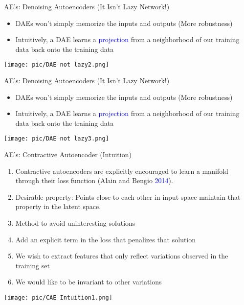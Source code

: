 \documentclass[serif, aspectratio=169]{beamer}
\begin{document}
\begin{frame}{AE’s: Denoising Autoencoders (It Isn’t Lazy Network!)}
    \begin{itemize}
        \item DAEs won’t simply memorize the inputs and outputs (More robustness)
        \item Intuitively, a DAE learns a \textcolor{blue}{projection} from a neighborhood of our training data back onto the training data 
    \end{itemize}

    \begin{center}
        \texttt{[image: pic/DAE not lazy2.png]}
    \end{center}
\end{frame}

\begin{frame}{AE’s: Denoising Autoencoders (It Isn’t Lazy Network!)}
    \begin{itemize}
        \item  DAEs won’t simply memorize the inputs and outputs (More robustness)
        \item Intuitively, a DAE learns a \textcolor{blue}{projection} from a neighborhood of our training data back onto the training data 
    \end{itemize}

    \begin{center}
        \texttt{[image: pic/DAE not lazy3.png]}
    \end{center}
\end{frame}

\begin{frame}{AE’s: Contractive Autoencoder (Intuition)}
    \small
    \begin{enumerate}
        \item Contractive autoencoders are explicitly encouraged to learn a manifold through their loss function (Alain and Bengio \textcolor{blue}{2014}).
        \item \textcolor{deepgreen}{Desirable property:} Points close to each other in input space maintain that property in the latent space.
        \item Method to avoid uninteresting solutions
        \item Add an explicit term in the loss that penalizes that solution
        \item We wish to extract features that only reflect variations observed in the training set
        \item We would like to be invariant to other variations
    \end{enumerate}
    
    
    \begin{center}
        \texttt{[image: pic/CAE Intuition1.png]} 
    \end{center}
    \vspace{0.4cm}

\end{frame}
\end{document}
